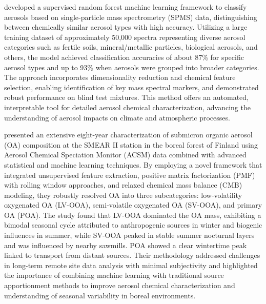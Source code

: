\documentclass[11pt]{article}
\begin{document}
\citet{christopoulos2018machine} developed a supervised random forest machine learning framework to classify aerosols based on single-particle mass spectrometry (SPMS) data, distinguishing between chemically similar aerosol types with high accuracy. Utilizing a large training dataset of approximately 50,000 spectra representing diverse aerosol categories such as fertile soils, mineral/metallic particles, biological aerosols, and others, the model achieved classification accuracies of about 87\% for specific aerosol types and up to 93\% when aerosols were grouped into broader categories. The approach incorporates dimensionality reduction and chemical feature selection, enabling identification of key mass spectral markers, and demonstrated robust performance on blind test mixtures. This method offers an automated, interpretable tool for detailed aerosol chemical characterization, advancing the understanding of aerosol impacts on climate and atmospheric processes.

\citet{heikkinen2021eight} presented an extensive eight-year characterization of submicron organic aerosol (OA) composition at the SMEAR II station in the boreal forest of Finland using Aerosol Chemical Speciation Monitor (ACSM) data combined with advanced statistical and machine learning techniques. By employing a novel framework that integrated unsupervised feature extraction, positive matrix factorization (PMF) with rolling window approaches, and relaxed chemical mass balance (CMB) modeling, they robustly resolved OA into three subcategories: low-volatility oxygenated OA (LV-OOA), semi-volatile oxygenated OA (SV-OOA), and primary OA (POA). The study found that LV-OOA dominated the OA mass, exhibiting a bimodal seasonal cycle attributed to anthropogenic sources in winter and biogenic influences in summer, while SV-OOA peaked in stable summer nocturnal layers and was influenced by nearby sawmills. POA showed a clear wintertime peak linked to transport from distant sources. Their methodology addressed challenges in long-term remote site data analysis with minimal subjectivity and highlighted the importance of combining machine learning with traditional source apportionment methods to improve aerosol chemical characterization and understanding of seasonal variability in boreal environments.
\end{document}
